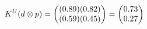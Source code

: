 \documentclass[preview]{standalone}
\begin{document}
\begin{align*}
\special{dvisvgm:raw <g id='unique000'>}K^U(d \otimes p) = \begin{pmatrix} (0.89)(0.82) \\ (0.59)(0.45) \end{pmatrix} = \begin{pmatrix} 0.73 \\ 0.27 \end{pmatrix}\special{dvisvgm:raw </g>}
\end{align*}
\end{document}
